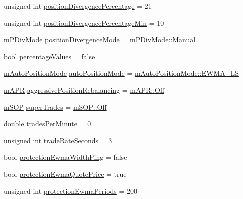 \begin{DoxyCompactItemize}
\item 
unsigned int \hyperlink{struct_k_1_1m_quoting_params_a87100c1d4acfed663be3c8a52ac3a646}{position\+Divergence\+Percentage} = 21
\item 
unsigned int \hyperlink{struct_k_1_1m_quoting_params_ac6a1449dd763064f3e4f741db7826f34}{position\+Divergence\+Percentage\+Min} = 10
\item 
\hyperlink{namespace_k_ac928319d6f2b7d9709cd3ca9fa6cb5a7}{m\+P\+Div\+Mode} \hyperlink{struct_k_1_1m_quoting_params_a2304a83d8a52934be7c132f9fb6fd479}{position\+Divergence\+Mode} = \hyperlink{namespace_k_a8708a45c314b4d4bb9e7221009ccee8aae1ba155a9f2e8c3be94020eef32a0301}{m\+P\+Div\+Mode\+::\+Manual}
\item 
bool \hyperlink{struct_k_1_1m_quoting_params_ac8404ecb555d84d2bef12ffae8b401b6}{percentage\+Values} = false
\item 
\hyperlink{namespace_k_a8708a45c314b4d4bb9e7221009ccee8a}{m\+Auto\+Position\+Mode} \hyperlink{struct_k_1_1m_quoting_params_a57aeb3184bd7e2fa299e62ddd0e64273}{auto\+Position\+Mode} = \hyperlink{namespace_k_a8708a45c314b4d4bb9e7221009ccee8aab539e10bdc606700e99b1e0cff611765}{m\+Auto\+Position\+Mode\+::\+E\+W\+M\+A\+\_\+\+LS}
\item 
\hyperlink{namespace_k_a8fb2f5e34d77eef380ac27a7737a3a25}{m\+A\+PR} \hyperlink{struct_k_1_1m_quoting_params_abce7d5d8bfe5b74771f69e8371ad8fb6}{aggressive\+Position\+Rebalancing} = \hyperlink{namespace_k_a89330b32d78089edeaa5bc6fe48d605dad15305d7a4e34e02489c74a5ef542f36}{m\+A\+P\+R\+::\+Off}
\item 
\hyperlink{namespace_k_a2f7964509b276df1811f64989ee56ca5}{m\+S\+OP} \hyperlink{struct_k_1_1m_quoting_params_a827aff7828ab29643db30a5b6e0cafbd}{super\+Trades} = \hyperlink{namespace_k_a89330b32d78089edeaa5bc6fe48d605dad15305d7a4e34e02489c74a5ef542f36}{m\+S\+O\+P\+::\+Off}
\item 
double \hyperlink{struct_k_1_1m_quoting_params_a4220b937e549b61ffd570c9e673ea8a8}{trades\+Per\+Minute} = 0.
\item 
unsigned int \hyperlink{struct_k_1_1m_quoting_params_a0ba45eb10ad95fea001ee29ae4fd5272}{trade\+Rate\+Seconds} = 3
\item 
bool \hyperlink{struct_k_1_1m_quoting_params_a066245465781f4f53120fc1ac38285c9}{protection\+Ewma\+Width\+Ping} = false
\item 
bool \hyperlink{struct_k_1_1m_quoting_params_a3df2bee8175846c2af077d3240f3d269}{protection\+Ewma\+Quote\+Price} = true
\item 
unsigned int \hyperlink{struct_k_1_1m_quoting_params_a8bf870ca98614079b091ef0123b86eab}{protection\+Ewma\+Periods} = 200

\end{DoxyCompactItemize}
